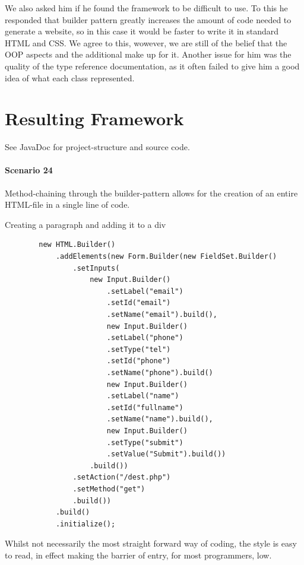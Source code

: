 \documentclass[12pt]{article}
\begin{document}
        We also asked him if he found the framework to be difficult to use. To this he responded that builder pattern greatly increases the amount of code needed to generate a website, so in this case it would be faster to write it in standard HTML and CSS. We agree to this, wowever, we are still of the belief that the OOP aspects and the additional make up for it. Another issue for him was the quality of the type reference documentation, as it often failed to give him a good idea of what each class represented.

\section{Resulting Framework}

    See JavaDoc for project-structure and source code.

    \paragraph{Scenario 24}
    Method-chaining through the builder-pattern allows for the creation of an entire HTML-file in a single line of code.

    \begin{shaded}
        Creating a paragraph and adding it to a div
        \begin{lstlisting}
        new HTML.Builder()
            .addElements(new Form.Builder(new FieldSet.Builder()
                .setInputs(
                    new Input.Builder()
                        .setLabel("email")
                        .setId("email")
                        .setName("email").build(),
                        new Input.Builder()
                        .setLabel("phone")
                        .setType("tel")
                        .setId("phone")
                        .setName("phone").build()
                        new Input.Builder()
                        .setLabel("name")
                        .setId("fullname")
                        .setName("name").build(),
                        new Input.Builder()
                        .setType("submit")
                        .setValue("Submit").build())
                    .build())
                .setAction("/dest.php")
                .setMethod("get")
                .build())
            .build()
            .initialize();
        \end{lstlisting}
    \end{shaded}

    Whilst not necessarily the most straight forward way of coding, the style is easy to read, in effect making the barrier of entry, for most programmers, low.
\end{document}
